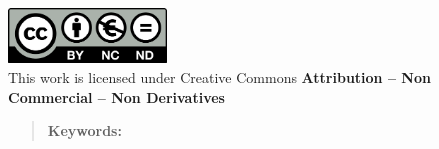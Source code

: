 \documentclass[12pt]{report} %
\begin{document}
\begin{titlepage}
\begin{sffamily}
    \noindent\includegraphics[width=4.2cm]{creativecommons.png}\\ %
    \footnotesize{This work is licensed under Creative Commons \textbf{Attribution – Non Commercial – Non Derivatives}}

  \end{sffamily}
\end{titlepage}

\newpage %
\thispagestyle{empty}
\mbox{}

\newpage %
\thispagestyle{empty}
\mbox{}

\renewcommand\abstractname{\large\bfseries\filcenter\uppercase{Summary}}
\begin{abstract}
  \thispagestyle{plain}
  \setcounter{page}{3}


  \textbf{Keywords:} %

  \vfill
\end{abstract}
\newpage %
\thispagestyle{empty}
\mbox{}



\setcounter{page}{5}


\vfill

\newpage %
\thispagestyle{empty}
\mbox{}



\tableofcontents
\thispagestyle{fancy}

\newpage %
\thispagestyle{empty}
\mbox{}

\listoffigures
\thispagestyle{fancy}

\newpage %
\thispagestyle{empty}
\mbox{}

\listoftables
\thispagestyle{fancy}
\end{document}
